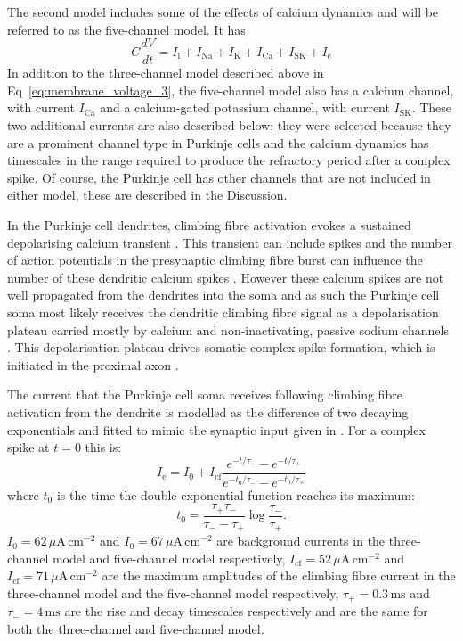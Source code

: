 \documentclass[utf8]{frontiersSCNS} %
\newcommand{\mse}{\,\mathrm{ms}}
\newcommand{\cm}{\,\mathrm{cm}}
\renewcommand{\k}{\mathrm{K}}
\newcommand{\ca}{\mathrm{Ca}}
\newcommand{\na}{\mathrm{Na}}
\newcommand{\sk}{\mathrm{SK}}
\newcommand{\leak}{\mathrm{l}}
\begin{document}
The second model includes some of the effects of calcium dynamics and
will be referred to as the five-channel model. It has
\begin{equation}
\label{eq:membrane_voltage_5}
C\frac{dV}{dt} =I_{\leak}+I_{\na}+I_\k+I_\ca+I_\sk+I_{\mathrm{e}}
\end{equation}
In addition to the three-channel model described above in
Eq~\ref{eq:membrane_voltage_3}, the five-channel model also has a
calcium channel, with current $I_\ca$ and a calcium-gated potassium
channel, with current $I_\sk$. These two additional currents are also
described below; they were selected because they are a prominent
channel type in Purkinje cells and the calcium dynamics has timescales
in the range required to produce the refractory period after a complex
spike. Of course, the Purkinje cell has other channels that are not
included in either model, these are described in the Discussion.

In the Purkinje cell dendrites, climbing fibre activation evokes a
sustained depolarising calcium transient
\cite{KitamuraHaeusser2011}. This transient can include spikes and the
number of action potentials in the presynaptic climbing fibre burst can influence
the number of these dendritic calcium spikes
\cite{LlinasSugimori1980a,KitamuraHaeusser2011,DavieEtAl2008,MathyEtAl2009}. However
these calcium spikes are not well propagated from the dendrites into
the soma \cite{DavieEtAl2008} and as such the Purkinje cell soma most
likely receives the dendritic climbing fibre signal as a
depolarisation plateau carried mostly by calcium and non-inactivating, passive sodium
channels
\cite{LlinasSugimori1980b,KnopfelEtAl1990,LlinasNicholson1971,StuartHausser1994}. This
depolarisation plateau drives somatic complex spike formation, which
is initiated in the proximal axon \cite{StuartHausser1994,DavieEtAl2008,PalmerEtAl2010}. 

The current that the Purkinje cell soma receives following climbing
fibre activation from the dendrite is modelled as the difference of
two decaying exponentials and fitted to mimic the synaptic input given in \cite{DavieEtAl2008}. For a complex spike at $t=0$ this is:
\begin{equation}
\label{eq:I_synapse}
I_{\mathrm{e}} = I_0+I_{\mathrm{cf}}\frac{e^{-t/\tau_-}-e^{-t/\tau_+}}{e^{-t_0/\tau_-}-e^{-t_0/\tau_+}}
\end{equation}
where $t_0$ is the time the double exponential function reaches its maximum:
\begin{equation}
t_0 = \frac{\tau_+\tau_-} {\tau_--\tau_+}\log{\frac{\tau_-}{\tau_+}}.
\end{equation}
$I_0=62\,\mu\mathrm{A}\cm^{-2}$ and $I_0=67\,\mu\mathrm{A}\cm^{-2}$
are background currents in the three-channel model and five-channel
model respectively, $I_{\mathrm{cf}}=52\,\mu\mathrm{A}\cm^{-2}$ and
$I_{\mathrm{cf}}=71\,\mu\mathrm{A}\cm^{-2}$ are the maximum amplitudes
of the climbing fibre current in the three-channel model and the
five-channel model respectively, $\tau_+=0.3\mse$ and $\tau_-=4\mse$
are the rise and decay timescales respectively and are the same for
both the three-channel and five-channel model.
\end{document}
